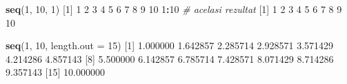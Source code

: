 \documentclass[]{article}
\newenvironment{Shaded}{\begin{snugshade}}{\end{snugshade}}
\newcommand{\CommentTok}[1]{\textcolor[rgb]{0.56,0.35,0.01}{\textit{#1}}}
\newcommand{\DataTypeTok}[1]{\textcolor[rgb]{0.13,0.29,0.53}{#1}}
\newcommand{\DecValTok}[1]{\textcolor[rgb]{0.00,0.00,0.81}{#1}}
\newcommand{\FloatTok}[1]{\textcolor[rgb]{0.00,0.00,0.81}{#1}}
\newcommand{\KeywordTok}[1]{\textcolor[rgb]{0.13,0.29,0.53}{\textbf{#1}}}
\newcommand{\NormalTok}[1]{#1}
\newcommand{\OperatorTok}[1]{\textcolor[rgb]{0.81,0.36,0.00}{\textbf{#1}}}
\begin{document}
\begin{Shaded}
\begin{Highlighting}[]
\KeywordTok{seq}\NormalTok{(}\DecValTok{1}\NormalTok{, }\DecValTok{10}\NormalTok{, }\DecValTok{1}\NormalTok{)}
\NormalTok{ [}\DecValTok{1}\NormalTok{]  }\DecValTok{1}  \DecValTok{2}  \DecValTok{3}  \DecValTok{4}  \DecValTok{5}  \DecValTok{6}  \DecValTok{7}  \DecValTok{8}  \DecValTok{9} \DecValTok{10}
\DecValTok{1}\OperatorTok{:}\DecValTok{10} \CommentTok{# acelasi rezultat}
\NormalTok{ [}\DecValTok{1}\NormalTok{]  }\DecValTok{1}  \DecValTok{2}  \DecValTok{3}  \DecValTok{4}  \DecValTok{5}  \DecValTok{6}  \DecValTok{7}  \DecValTok{8}  \DecValTok{9} \DecValTok{10}

\KeywordTok{seq}\NormalTok{(}\DecValTok{1}\NormalTok{, }\DecValTok{10}\NormalTok{, }\DataTypeTok{length.out =} \DecValTok{15}\NormalTok{)}
\NormalTok{ [}\DecValTok{1}\NormalTok{]  }\FloatTok{1.000000}  \FloatTok{1.642857}  \FloatTok{2.285714}  \FloatTok{2.928571}  \FloatTok{3.571429}  \FloatTok{4.214286}  \FloatTok{4.857143}
\NormalTok{ [}\DecValTok{8}\NormalTok{]  }\FloatTok{5.500000}  \FloatTok{6.142857}  \FloatTok{6.785714}  \FloatTok{7.428571}  \FloatTok{8.071429}  \FloatTok{8.714286}  \FloatTok{9.357143}
\NormalTok{[}\DecValTok{15}\NormalTok{] }\FloatTok{10.000000}
\end{Highlighting}
\end{Shaded}
\end{document}

